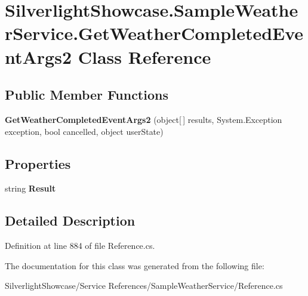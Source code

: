 \hypertarget{class_silverlight_showcase_1_1_sample_weather_service_1_1_get_weather_completed_event_args2}{
\section{SilverlightShowcase.SampleWeatherService.GetWeatherCompletedEventArgs2 Class Reference}
\label{class_silverlight_showcase_1_1_sample_weather_service_1_1_get_weather_completed_event_args2}
}
\subsection*{Public Member Functions}
\begin{DoxyCompactItemize}
\item 
\hypertarget{class_silverlight_showcase_1_1_sample_weather_service_1_1_get_weather_completed_event_args2_ac697893317bd574b7c8879d38210fee6}{
{\bfseries GetWeatherCompletedEventArgs2} (object\mbox{[}$\,$\mbox{]} results, System.Exception exception, bool cancelled, object userState)}
\label{class_silverlight_showcase_1_1_sample_weather_service_1_1_get_weather_completed_event_args2_ac697893317bd574b7c8879d38210fee6}

\end{DoxyCompactItemize}
\subsection*{Properties}
\begin{DoxyCompactItemize}
\item 
\hypertarget{class_silverlight_showcase_1_1_sample_weather_service_1_1_get_weather_completed_event_args2_a6bd3beaa1c28947e79f87c8f9dfdf3e7}{
string {\bfseries Result}}
\label{class_silverlight_showcase_1_1_sample_weather_service_1_1_get_weather_completed_event_args2_a6bd3beaa1c28947e79f87c8f9dfdf3e7}

\end{DoxyCompactItemize}


\subsection{Detailed Description}


Definition at line 884 of file Reference.cs.

The documentation for this class was generated from the following file:\begin{DoxyCompactItemize}
\item 
SilverlightShowcase/Service References/SampleWeatherService/Reference.cs\end{DoxyCompactItemize}
